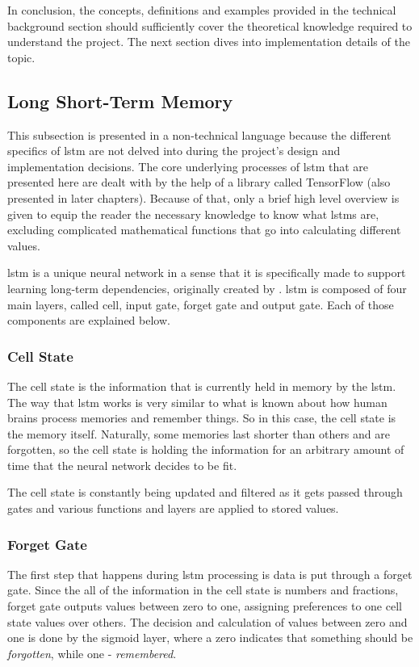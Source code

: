             In conclusion, the concepts, definitions and examples provided in the technical background section should sufficiently cover the theoretical knowledge required to understand the project. The next section dives into implementation details of the topic.
    
    \subsection{Long Short-Term Memory} \label{lstm}
        This subsection is presented in a non-technical language because the different specifics of \gls{lstm} are not delved into during the project's design and implementation decisions. The core underlying processes of \gls{lstm} that are presented here are dealt with by the help of a library called TensorFlow (also presented in later chapters). Because of that, only a brief high level overview is given to equip the reader the necessary knowledge to know what \gls{lstm}s are, excluding complicated mathematical functions that go into calculating different values.
        
        \gls{lstm} is a unique neural network in a sense that it is specifically made to support learning long-term dependencies, originally created by \autocite{Hochreiter1997LongSM}. \gls{lstm} is composed of four main layers, called cell, input gate, forget gate and output gate. Each of those components are explained below.
        
        \subsubsection{Cell State}
            The cell state is the information that is currently held in memory by the \gls{lstm}. The way that \gls{lstm} works is very similar to what is known about how human brains process memories and remember things. So in this case, the cell state is the memory itself. Naturally, some memories last shorter than others and are forgotten, so the cell state is holding the information for an arbitrary amount of time that the neural network decides to be fit.
            
            The cell state is constantly being updated and filtered as it gets passed through gates and various functions and layers are applied to stored values.
            
        \subsubsection{Forget Gate}
            The first step that happens during \gls{lstm} processing is data is put through a forget gate. Since the all of the information in the cell state is numbers and fractions, forget gate outputs values between zero to one, assigning preferences to one cell state values over others. The decision and calculation of values between zero and one is done by the sigmoid layer, where a zero indicates that something should be \textit{forgotten}, while one - \textit{remembered}.
            
